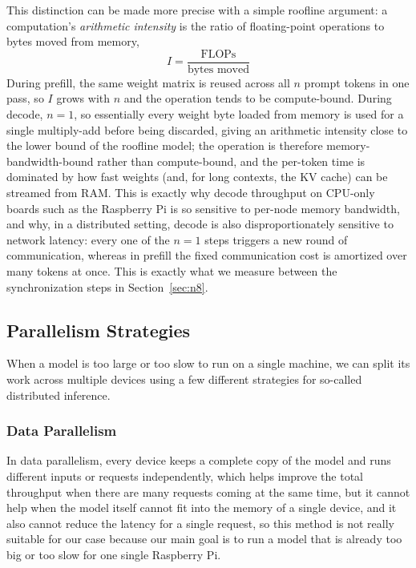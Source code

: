 \documentclass[11pt,a4paper]{article}
\begin{document}
This distinction can be made more precise with a simple roofline argument: a computation's \emph{arithmetic intensity} is the ratio of floating-point operations to bytes moved from memory,
\begin{equation}
I = \frac{\text{FLOPs}}{\text{bytes moved}}
\label{eq:intensity}
\end{equation}
During prefill, the same weight matrix is reused across all $n$ prompt tokens in one pass, so $I$ grows with $n$ and the operation tends to be compute-bound. During decode, $n=1$, so essentially every weight byte loaded from memory is used for a single multiply-add before being discarded, giving an arithmetic intensity close to the lower bound of the roofline model; the operation is therefore memory-bandwidth-bound rather than compute-bound, and the per-token time is dominated by how fast weights (and, for long contexts, the KV cache) can be streamed from RAM. This is exactly why decode throughput on CPU-only boards such as the Raspberry Pi is so sensitive to per-node memory bandwidth, and why, in a distributed setting, decode is also disproportionately sensitive to network latency: every one of the $n=1$ steps triggers a new round of communication, whereas in prefill the fixed communication cost is amortized over many tokens at once. This is exactly what we measure between the synchronization steps in Section~\ref{sec:n8}.

\subsection{Parallelism Strategies}\label{sec:n2_2} %

When a model is too large or too slow to run on a single machine, we can split its work across multiple devices using a few different strategies for so-called distributed inference.

\subsubsection{Data Parallelism}\label{sec:n2_2_1}
In data parallelism, every device keeps a complete copy of the model and runs different inputs or requests independently, which helps improve the total throughput when there are many requests coming at the same time, but it cannot help when the model itself cannot fit into the memory of a single device, and it also cannot reduce the latency for a single request, so this method is not really suitable for our case because our main goal is to run a model that is already too big or too slow for one single Raspberry Pi.
\end{document}
